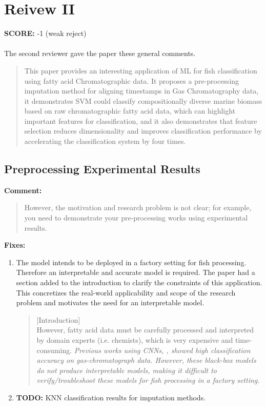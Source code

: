 \documentclass[runningheads]{llncs}
\begin{document}
\section{Reivew II}

\textbf{SCORE:} -1 (weak reject)
\\\\
The second reviewer gave the paper these general comments. 

\begin{quote}
  This paper provides an interesting application of ML for fish classification using fatty acid Chromatographic data. It proposes a pre-processing imputation method for aligning timestamps in Gas Chromatography data, it demonstrates SVM could classify compositionally diverse marine biomass based on raw chromatographic fatty acid data, which can highlight important features for classification, and it also demonstrates that feature selection reduces dimensionality and improves classification performance by accelerating the classification system by four times.
\end{quote}

\subsection{Preprocessing Experimental Results}

\textbf{Comment:}

\begin{quote}
  However, the motivation and research problem is not clear; 
  for example, you need to demonstrate your pre-processing works using experimental results. 
\end{quote}

\noindent\textbf{Fixes:}

\begin{enumerate}
  \item The model intends to be deployed in a factory setting for fish processing. Therefore an interpretable and accurate model is required. The paper had a section added to the introduction to clarify the constraints of this application. This concretizes the real-world applicability and scope of the research problem and motivates the need for an interpretable model. 
  \begin{quote}
    [Introduction] \\ 
    However, fatty acid data must be carefully processed and interpreted by domain experts (i.e. chemists), which is very expensive and time-consuming.
    \emph{Previous works using CNNs, \cite{bi2020gc,matyushin2020gas}, showed high classification accuracy on gas-chromatograph data. 
    However, these black-box models do not produce interpretable models, making it difficult to verify/troubleshoot these models for fish processing in a factory setting.}
  \end{quote}
  \item \textbf{TODO:} KNN classification results for imputation methods. 
\end{enumerate}
\end{document}

